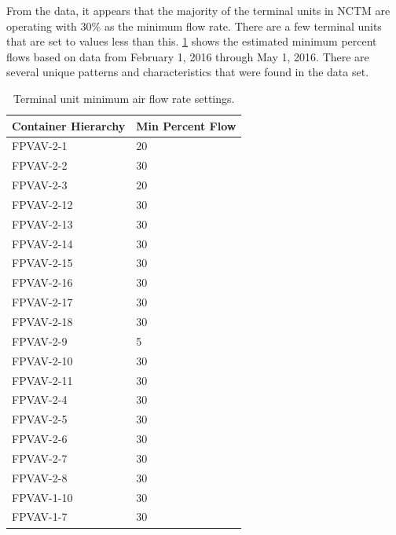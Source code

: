 From the data, it appears that the majority of the terminal units in
NCTM are operating with 30\% as the minimum flow rate. There are a few
terminal units that are set to values less than this. \tableref{}
\ref{tab:MinimumAirFlowRateSettings} shows the estimated minimum percent
flows based on data from February 1, 2016 through May 1, 2016. There are
several unique patterns and characteristics that were found in the data
set.




\begin{table}[]
\centering
\caption{Terminal unit minimum air flow rate settings.}
\label{tab:MinimumAirFlowRateSettings}
\begin{tabular}{ll}
    \toprule
Container Hierarchy & Min Percent Flow \\ \midrule
FPVAV-2-1           & 20               \\
FPVAV-2-2           & 30               \\
FPVAV-2-3           & 20               \\
FPVAV-2-12          & 30               \\
FPVAV-2-13          & 30               \\
FPVAV-2-14          & 30               \\
FPVAV-2-15          & 30               \\
FPVAV-2-16          & 30               \\
FPVAV-2-17          & 30               \\
FPVAV-2-18          & 30               \\
FPVAV-2-9           & 5                \\
FPVAV-2-10          & 30               \\
FPVAV-2-11          & 30               \\
FPVAV-2-4           & 30               \\
FPVAV-2-5           & 30               \\
FPVAV-2-6           & 30               \\
FPVAV-2-7           & 30               \\
FPVAV-2-8           & 30               \\
FPVAV-1-10          & 30               \\
FPVAV-1-7           & 30               \\

\end{tabular}
\end{table}
